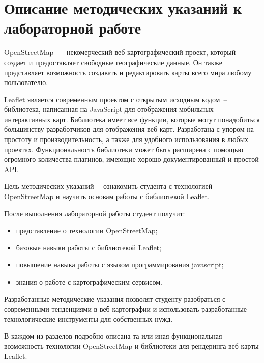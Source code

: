 \documentclass[a4paper, 14pt]{extreport}
\begin{document}
    \chapter{Описание методических указаний к лабораторной работе}
    OpenStreetMap~--- некомерческий веб-картографический проект, который
    создает и предоставляет свободные географические данные. Он также
    представляет возможность создавать и редактировать карты всего мира
    любому пользователю.

    Leaflet является современным проектом с открытым исходным кодом~--
    библиотека, написанная на JavaScript для отображения мобильных
    интерактивных карт. Библиотека имеет все функции, которые могут
    понадобиться большинству разработчиков для отображения веб-карт.
    Разработана с упором на простоту и производительность, а также для удобного
    использования в любых проектах. Функциональность библиотеки может быть
    расширена с помощью огромного количества плагинов, имеющие хорошо
    документированный и простой API.

    Цель методических указаний~-- ознакомить студента с технологией\\
    OpenStreetMap и научить основам работы с библиотекой Leaflet.

    После выполнения лабораторной работы студент получит:
    \begin{itemize}
        \item представление о технологии OpenStreetMap;
        \item базовые навыки работы с библиотекой Leaflet;
        \item повышение навыка работы с языком программирования javascript;
        \item знания о работе с картографическим сервисом.
    \end{itemize}
    
    Разработанные методические указания позволят студенту разобраться с
    современными тенденциями в веб-картографии и использовать разработанные
    технологические инструменты для собственных нужд.  

    В каждом из разделов подробно описана та или иная функциональная
    возможность технологии OpenStreetMap и библиотеки для рендеринга веб-карты
    Leaflet.
\end{document}
